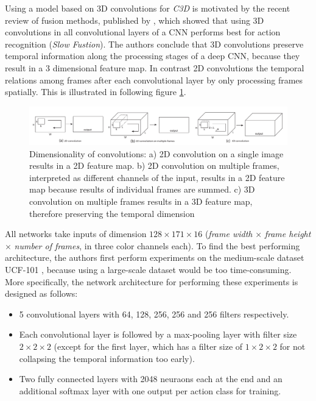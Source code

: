 Using a model based on 3D convolutions for \textit{C3D} is motivated by the recent review of fusion methods, published by \textcite{karpathy_large-scale_2014}, which showed that using 3D convolutions in all convolutional layers of a CNN performs best for action recognition (\textit{Slow Fustion}).  
The authors conclude that 3D convolutions preserve temporal information along the processing stages of a deep CNN, because they result in a 3 dimensional feature map.
In contrast 2D convolutions the temporal relations among frames after each convolutional layer by only processing frames spatially.
This is illustrated in following figure \ref{fig:c3d_2dconv3dconv}.
\begin{figure}[H]
    \centering
    \includegraphics[width=\textwidth]{img_deep/c3d_2dconv3dconv}
\caption{Dimensionality of convolutions: a) 2D convolution on a single image results in a 2D feature map. b) 2D convolution on multiple frames, interpreted as different channels of the input, results in a 2D feature map because results of individual frames are summed. c) 3D convolution on multiple frames results in a 3D feature map, therefore preserving the temporal dimension \cite{karpathy_large-scale_2014}}
    \label{fig:c3d_2dconv3dconv}
\end{figure}

All networks take inputs of dimension $128\times171\times16$ (\textit{frame width} $\times$ \textit{frame height} $\times$ \textit{number of frames}, in three color channels each).
To find the best performing architecture, the authors first perform experiments on the medium-scale dataset UCF-101 \cite{soomro_ucf101:_2012}, because using a large-scale dataset would be too time-consuming.
More specifically, the network architecture for performing these experiments is designed as follows:
\begin{itemize}
    \item 5 convolutional layers with 64, 128, 256, 256 and 256 filters respectively.
    \item Each convolutional layer is followed by a max-pooling layer with filter size $2\times2\times2$ (except for the first layer, which has a filter size of $1\times2\times2$ for not collapsing the temporal information too early).
    \item Two fully connected layers with 2048 neuraons each at the end and an additional softmax layer with one output per action class for training.
\end{itemize}

